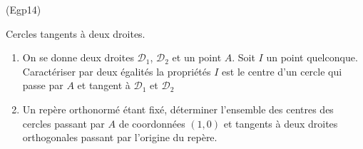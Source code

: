 \begin{tiny}(Egp14)\end{tiny} Cercles tangents à deux droites.
\begin{enumerate}
 \item On se donne deux droites $\mathcal{D}_1$, $\mathcal{D}_2$ et un point $A$. Soit $I$ un point quelconque. Caractériser par deux égalités la propriétés\newline
\og $I$ est le centre d'un cercle qui passe par $A$ et tangent à $\mathcal{D}_1$ et $\mathcal{D}_2$ \fg
\item Un repère orthonormé étant fixé, déterminer l'ensemble des centres des cercles passant par $A$ de coordonnées $(1,0)$ et tangents à deux droites orthogonales passant par l'origine du repère.  
\end{enumerate}
